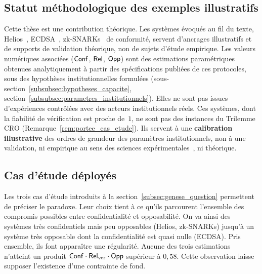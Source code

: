 \subsection{Statut m\'ethodologique des exemples illustratifs}
\label{subsec:note_methodo}
\begin{sloppypar}
Cette th\`ese est une contribution th\'eorique. Les syst\`emes \'evoqu\'es au fil
du texte, Helios~\cite{Adida08,Adida09UCL}, ECDSA~\cite{Johnson01,NIST.FIPS.186-5},
zk-SNARKs~\cite{Groth16,Gennaro13,BCTV14} de conformit\'e, servent d'ancrages
illustratifs et de supports de validation th\'eorique, non de sujets d'\'etude
empirique. Les valeurs num\'eriques associ\'ees ($\mathsf{Conf}$, $\mathsf{Rel}$, $\mathsf{Opp}$) sont
des estimations param\'etriques obtenues analytiquement \`a partir des sp\'ecifications
publi\'ees de ces protocoles, sous des hypoth\`eses institutionnelles
formul\'ees (sous-section~\ref{subsubsec:hypotheses_capacite},
section~\ref{subsubsec:parametres_institutionnels}). Elles ne sont pas issues
d'exp\'eriences contr\^ol\'ees avec des acteurs institutionnels r\'eels. Ces
syst\`emes, dont la fiabilit\'e de v\'erification est proche de~$1$, ne sont pas
des instances du Trilemme CRO (Remarque~\ref{rem:portee_cas_etude}). Ils
servent \`a une \textbf{calibration illustrative} des ordres de grandeur des
param\`etres institutionnels, non \`a une validation, ni empirique au sens des
sciences exp\'erimentales~\cite{Tsybakov2009}, ni th\'eorique.
\end{sloppypar}

\subsection{Cas d'\'etude d\'eploy\'es}
\label{subsec:cas_etude}
\begin{sloppypar}
Les trois cas d'\'etude introduits \`a la section~\ref{subsec:genese_question} permettent de pr\'eciser le paradoxe. Leur choix tient \`a ce qu'ils
parcourent l'ensemble des compromis possibles entre confidentialit\'e et
opposabilit\'e. On va ainsi des syst\`emes tr\`es confidentiels mais peu opposables
(Helios, zk-SNARKs) jusqu'\`a un syst\`eme tr\`es opposable dont la confidentialit\'e
est quasi nulle (ECDSA). Pris ensemble, ils font appara\^itre une r\'egularit\'e.
Aucune des trois estimations n'atteint un produit $\mathsf{Conf} \cdot \mathsf{Rel}_{\mathrm{ver}} \cdot \mathsf{Opp}$
sup\'erieur \`a $0{,}58$. Cette observation laisse supposer l'existence d'une
contrainte de fond.
\end{sloppypar}

